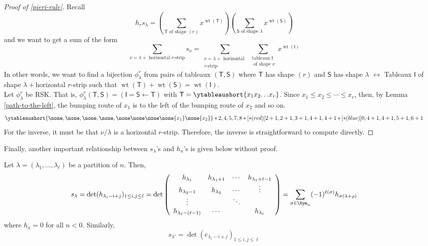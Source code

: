 \documentclass[11pt,leqno,oneside]{amsart}
\numberwithin{thm}{section}
\newcommand{\T}{\mathsf{T}} %
\renewcommand{\S}{\mathsf{S}}
\newcommand{\rowshift}{\rho}
\newcommand{\wt}{\operatorname{wt}}
\begin{document}
\begin{proof}[Proof of \ref{pieri-rule}]
  Recall \[
    h_r s_\lambda = \left( \sum_{\T \text{ of shape }(r)} x^{\wt(\T)}
    \right) \left( \sum_{\S \text{ of shape }\lambda} x^{\wt(\S)}\right)
  \]
  and we want to get a sum of the form \[
    \sum_{\nu = \lambda+\text{ horizontal }r\text{-strip}} s_\nu =
    \sum_{\substack{\nu = \lambda+\text{ horizontal }\\r\text{-strip}}}
    \sum_{\substack{\text{tableaux }\mathsf{I}\\\text{ of shape }\nu}} x^{\wt(\mathsf{I})}
  \]
  In other words, we want to find a bijection \(\phi_\lambda^r\) from
  pairs of tableaux \((\T,\S)\) where \(\T\) has shape \((r)\) and
  \(\S\) has shape \(\lambda\) \(\leftrightarrow\) Tableaux
  \(\mathsf{I}\) of shape \(\lambda+\)horizontal \(r\)-strip such that
  \(\wt(\T)+\wt(\S)=\wt(\mathsf{I})\).\\

  Let \(\phi_\lambda^r\) be RSK. That is, \(\phi_{\lambda}^r(\T,\S) =
  (\mathsf{I} = \S \leftarrow \T)\) with \(\T =
  \ytableaushort{{x_1}{x_2}{\dots}{x_r}}\). Since \(x_1 \leq x_2 \leq
  \cdots \leq x_r\), then, by Lemma \ref{path-to-the-left}, the
  bumping route of \(x_1\) is to the left of the bumping route of
  \(x_2\) and so on. \[
    \ytableaushort{\none,\none,\none,\none,\none\none\none\none{x_1}\none{x_2}}*{2,4,5,7,8}*[*(red)]{2+1,2+1,3+1,4+1,4+1}*[*(blue)]{0,4+1,4+1,5+1,6+1}
  \]
  For the inverse, it must be that \(\nu/\lambda\) is a horizontal
  \(r\)-strip. Therefore, the inverse is straightforward to compute
  directly.
\end{proof}
Finally, another important relationship between \(s_\lambda\)'s and
\(h_n\)'s is given below without proof.
\begin{thm}
  Let \(\lambda = (\lambda_1, \ldots, \lambda_\ell)\) be a
  partition of \(n\). Then, \[ 
    s_\lambda = \det(h_{\lambda_i-i+j})_{1 \leq i,j \leq \ell} = \det\left(
      \begin{array}{cccc}
        h_{\lambda_1} & h_{\lambda_1+1} & \cdots &
                                                   h_{\lambda_1+\ell-1}\\
        h_{\lambda_2-1} & h_{\lambda_2} & \cdots & \vdots \\
        \vdots & & \ddots & \\
        h_{\lambda_\ell-(\ell-1)} & \cdots & & h_{\lambda_\ell}
      \end{array}
    \right)  = \sum_{\sigma \in \Sym_n} (-1)^{\ell(\sigma)}
    h_{\sigma(\lambda+\rowshift)} 
  \]
  where \(h_n = 0\) for all \(n < 0\). Similarly, \[
    s_{\lambda'} = \det(e_{\lambda_i-i+j})_{1 \leq i,j \leq \ell}
  \]
\end{thm}
\end{document}
